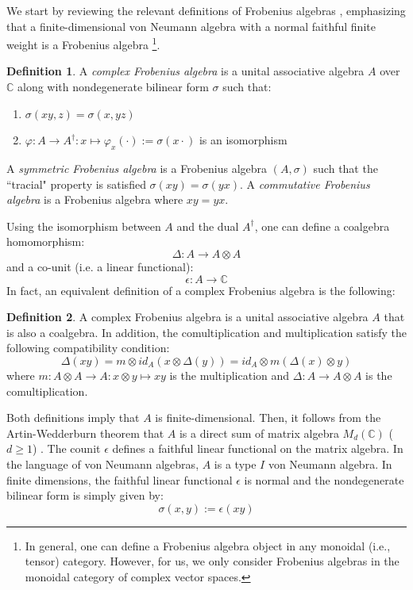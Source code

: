 \documentclass[a4paper,11pt]{article}
\theoremstyle{definition}
\newtheorem{definition}{Definition}[section]
\numberwithin{equation}{section}
\begin{document}
We start by reviewing the relevant definitions of Frobenius algebras \cite{abrams1996two, frobeniusTQFT2, frobeniusTQFT3}, emphasizing that a finite-dimensional von Neumann algebra with a normal faithful finite weight is a Frobenius algebra \footnote{In general, one can define a Frobenius algebra object in any monoidal (i.e., tensor) category. However, for us, we only consider Frobenius algebras in the monoidal category of complex vector spaces.}. 
\begin{definition}\label{def1Frobeinus}
    A {\it complex Frobenius algebra} is a unital associative algebra $A$ over $\mathbb{C}$ along with nondegenerate bilinear form $\sigma$ such that:
    \begin{enumerate}
        \item $\sigma(xy, z) = \sigma(x, yz)$
        \item $\varphi:A\rightarrow A^\dagger:x\mapsto \varphi_x(\cdot):=\sigma(x\cdot)$ is an isomorphism
    \end{enumerate}

    A {\it symmetric Frobenius algebra} is a Frobenius algebra $(A,\sigma)$ such that the ``tracial" property is satisfied $\sigma(xy) = \sigma(yx)$. A {\it commutative Frobenius algebra} is a Frobenius algebra where $xy = yx$.
\end{definition}
Using the isomorphism between $A$ and the dual $A^\dagger$, one can define a coalgebra homomorphism:
\begin{equation}
    \Delta: A\rightarrow A\otimes A
\end{equation}
and a co-unit (i.e. a linear functional):
\begin{equation}
    \epsilon:A\rightarrow \mathbb{C}
\end{equation}
In fact, an equivalent definition of a complex Frobenius algebra is the following:
\begin{definition}\label{def2Frobenius}
    A complex Frobenius algebra is a unital associative algebra $A$ that is also a coalgebra. In addition, the comultiplication and multiplication satisfy the following compatibility condition:
    \begin{equation}
        \Delta(xy) = m\otimes id_A(x\otimes\Delta(y)) = id_A\otimes m(\Delta(x)\otimes y)
    \end{equation}
    where $m:A\otimes A\rightarrow A:x\otimes y\mapsto xy$ is the multiplication and $\Delta:A\rightarrow A\otimes A$ is the comultiplication.
\end{definition}
Both definitions imply that $A$ is finite-dimensional. Then, it follows from the Artin-Wedderburn theorem that $A$ is a direct sum of matrix algebra $M_d(\mathbb{C})$ ($d\geq1$) \cite{lang02}. The counit $\epsilon$ defines a faithful linear functional on the matrix algebra. In the language of von Neumann algebras, $A$ is a type $I$ von Neumann algebra. In finite dimensions, the faithful linear functional $\epsilon$ is normal and the nondegenerate bilinear form is simply given by:
\begin{equation}
    \sigma(x,y) := \epsilon(xy)
\end{equation}
\end{document}
